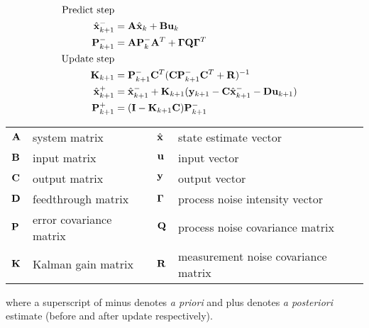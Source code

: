 \begin{theorem}
  \label{thm:kalman_filter}
  \begin{align}
    \text{Predict step} \nonumber \\
    \hat{\mathbf{x}}_{k+1}^- &= \mathbf{A}\hat{\mathbf{x}}_k + \mathbf{B} \mathbf{u}_k \\
    \mathbf{P}_{k+1}^- &= \mathbf{A} \mathbf{P}_k^- \mathbf{A}^T +
      \mathbf{\Gamma}\mathbf{Q}\mathbf{\Gamma}^T \\
    \text{Update step} \nonumber \\
    \mathbf{K}_{k+1} &=
      \mathbf{P}_{k+1}^- \mathbf{C}^T (\mathbf{C}\mathbf{P}_{k+1}^- \mathbf{C}^T +
      \mathbf{R})^{-1} \\
    \hat{\mathbf{x}}_{k+1}^+ &=
      \hat{\mathbf{x}}_{k+1}^- + \mathbf{K}_{k+1}(\mathbf{y}_{k+1} -
      \mathbf{C} \hat{\mathbf{x}}_{k+1}^- - \mathbf{D}\mathbf{u}_{k+1}) \\
    \mathbf{P}_{k+1}^+ &= (\mathbf{I} - \mathbf{K}_{k+1}\mathbf{C})\mathbf{P}_{k+1}^-
  \end{align}
  \begin{figurekey}
    \begin{tabular}{llll}
      $\mathbf{A}$ & system matrix & $\hat{\mathbf{x}}$ & state estimate vector \\
      $\mathbf{B}$ & input matrix       & $\mathbf{u}$ & input vector \\
      $\mathbf{C}$ & output matrix      & $\mathbf{y}$ & output vector \\
      $\mathbf{D}$ & feedthrough matrix & $\mathbf{\Gamma}$ & process noise intensity
        vector \\
      $\mathbf{P}$ & error covariance matrix & $\mathbf{Q}$ & process noise covariance
        matrix \\
      $\mathbf{K}$ & Kalman gain matrix & $\mathbf{R}$ & measurement noise covariance
        matrix
    \end{tabular}
  \end{figurekey}

  where a superscript of minus denotes \textit{a priori} and plus denotes
  \textit{a posteriori} estimate (before and after update respectively).
\end{theorem}

